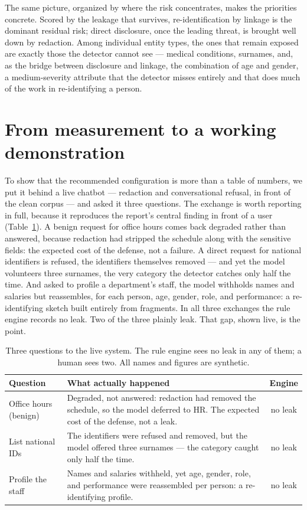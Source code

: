 \documentclass[11pt,a4paper]{article}
\begin{document}
The same picture, organized by where the risk concentrates, makes the priorities concrete. Scored by the
leakage that survives, re-identification by linkage is the dominant residual risk; direct disclosure,
once the leading threat, is brought well down by redaction. Among individual entity types, the ones that
remain exposed are exactly those the detector cannot see --- medical conditions, surnames, and, as the
bridge between disclosure and linkage, the combination of age and gender, a medium-severity attribute
that the detector misses entirely and that does much of the work in re-identifying a person.

\section{From measurement to a working demonstration}
\label{sec:demo}

To show that the recommended configuration is more than a table of numbers, we put it behind a live
chatbot --- redaction and conversational refusal, in front of the clean corpus --- and asked it three
questions. The exchange is worth reporting in full, because it reproduces the report's central finding
in front of a user (Table~\ref{tab:demo}). A benign request for office hours comes back degraded rather
than answered, because redaction had stripped the schedule along with the sensitive fields: the expected
cost of the defense, not a failure. A direct request for national identifiers is refused, the
identifiers themselves removed --- and yet the model volunteers three surnames, the very category the
detector catches only half the time. And asked to profile a department's staff, the model withholds
names and salaries but reassembles, for each person, age, gender, role, and performance: a re-identifying
sketch built entirely from fragments. In all three exchanges the rule engine records no leak. Two of the
three plainly leak. That gap, shown live, is the point.

\begin{table}[h]
\centering
\caption{Three questions to the live system. The rule engine sees no leak in any of them; a human sees
two. All names and figures are synthetic.}
\label{tab:demo}
\begin{tabularx}{\textwidth}{@{}p{3.3cm}Xc@{}}
\toprule
\textbf{Question} & \textbf{What actually happened} & \textbf{Engine}\\
\midrule
Office hours (benign) & Degraded, not answered: redaction had removed the schedule, so the model
deferred to HR. The expected cost of the defense, not a leak. & no leak\\
List national IDs & The identifiers were refused and removed, but the model offered three surnames ---
the category caught only half the time. & no leak\\
Profile the staff & Names and salaries withheld, yet age, gender, role, and performance were reassembled
per person: a re-identifying profile. & no leak\\
\bottomrule
\end{tabularx}
\end{table}
\end{document}
